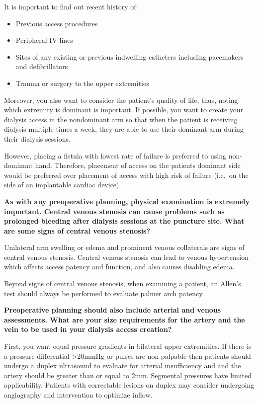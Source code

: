 \documentclass[
]{book}
\begin{document}
It is important to find out recent history of:

\begin{itemize}
\item
  Previous access procedures
\item
  Peripheral IV lines
\item
  Sites of any existing or previous indwelling catheters including
  pacemakers and defibrillators
\item
  Trauma or surgery to the upper extremities
\end{itemize}

Moreover, you also want to consider the patient's quality of life, thus,
noting which extremity is dominant is important. If possible, you want
to create your dialysis access in the nondominant arm so that when the
patient is receiving dialysis multiple times a week, they are able to
use their dominant arm during their dialysis sessions.

However, placing a fistula with lowest rate of failure is preferred to
using non-dominant hand. Therefore, placement of access on the patients
dominant side would be preferred over placement of access with high risk
of failure (i.e.~on the side of an implantable cardiac
device).\citep{sgroi2019}

\textbf{As with any preoperative planning, physical examination is extremely
important. Central venous stenosis can cause problems such as prolonged
bleeding after dialysis sessions at the puncture site. What are some
signs of central venous stenosis?}

Unilateral arm swelling or edema and prominent venous collaterals are
signs of central venous stenosis. Central venous stenosis can lead to
venous hypertension which affects access patency and function, and also
causes disabling edema.

Beyond signs of central venous stenosis, when examining a patient, an
Allen's test should always be performed to evaluate palmer arch patency.

\textbf{Preoperative planning should also include arterial and venous
assessments. What are your size requirements for the artery and the vein
to be used in your dialysis access creation?}

First, you want equal pressure gradients in bilateral upper extremities.
If there is a pressure differential \textgreater20mmHg or pulses are non-palpable
then patients should undergo a duplex ultrasound to evaluate for
arterial insufficiency and and the artery should be greater than or
equal to 2mm. Segmental pressures have limited applicability. Patients
with correctable lesions on duplex may consider undergoing angiography
and intervention to optimize inflow.\citep{sidawy2008}
\end{document}
